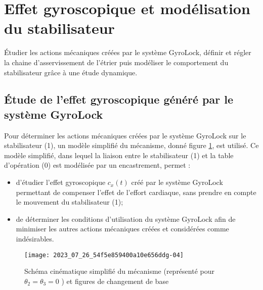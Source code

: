 
\section{Effet gyroscopique et modélisation du stabilisateur}
\begin{obj}
Étudier les actions mécaniques créées par le système GyroLock, définir et régler la chaine d'asservissement de l'étrier puis modéliser le comportement du stabilisateur grâce à une étude dynamique.
\end{obj}

\subsection{\label{sec:IIA} Étude de l'effet gyroscopique généré par le système GyroLock}
Pour déterminer les actions mécaniques créées par le système GyroLock sur le stabilisateur (1), un modèle simplifié du mécanisme, donné figure \ref{fig_ccspsi2022:06}, est utilisé. Ce modèle simplifié, dans lequel la liaison entre le stabilisateur (1) et la table d'opération (0) est modélisée par un encastrement, permet :

\begin{itemize}
  \item d'étudier l'effet gyroscopique $c_{x}(t)$ créé par le système GyroLock permettant de compenser l'effet de l'effort cardiaque, sans prendre en compte le mouvement du stabilisateur (1);

  \item de déterminer les conditions d'utilisation du système GyroLock afin de minimiser les autres actions mécaniques créées et considérées comme indésirables.
\end{itemize}


\begin{figure}[!h]
\centering
\texttt{[image: 2023\_07\_26\_54f5e859400a10e656ddg-04]}
\caption{\label{fig_ccspsi2022:06}Schéma cinématique simplifié du mécanisme (représenté pour $\theta_{2}=\theta_{3}=0$ ) et figures de changement de base}
\end{figure}

